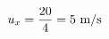 \documentclass[preview]{standalone}
\begin{document}
\begin{align*}
\special{dvisvgm:raw <g id='unique000'>}u_x = \frac{20}{4} = 5 \text{ m/s}\special{dvisvgm:raw </g>}
\end{align*}
\end{document}
